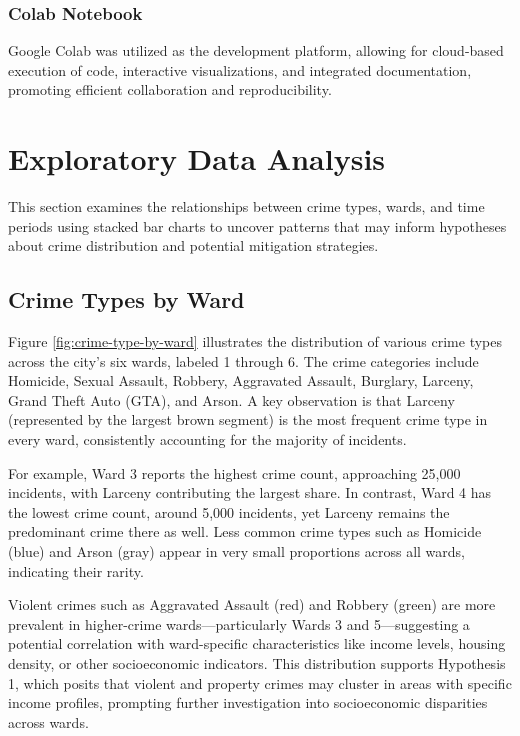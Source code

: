 \documentclass{report}
\begin{document}
	\subsection{Colab Notebook}
	Google Colab was utilized as the development platform, allowing for cloud-based execution of code, interactive visualizations, and integrated documentation, promoting efficient collaboration and reproducibility.
	
	\chapter{Exploratory Data Analysis}
	
	\par This section examines the relationships between crime types, wards, and time periods using stacked bar charts to uncover patterns that may inform hypotheses about crime distribution and potential mitigation strategies.
	
	\section{Crime Types by Ward}
	\par  Figure \ref{fig:crime-type-by-ward} illustrates the distribution of various crime types across the city’s six wards, labeled 1 through 6. The crime categories include Homicide, Sexual Assault, Robbery, Aggravated Assault, Burglary, Larceny, Grand Theft Auto (GTA), and Arson. A key observation is that Larceny (represented by the largest brown segment) is the most frequent crime type in every ward, consistently accounting for the majority of incidents.

For example, Ward 3 reports the highest crime count, approaching 25,000 incidents, with Larceny contributing the largest share. In contrast, Ward 4 has the lowest crime count, around 5,000 incidents, yet Larceny remains the predominant crime there as well. Less common crime types such as Homicide (blue) and Arson (gray) appear in very small proportions across all wards, indicating their rarity.

Violent crimes such as Aggravated Assault (red) and Robbery (green) are more prevalent in higher-crime wards—particularly Wards 3 and 5—suggesting a potential correlation with ward-specific characteristics like income levels, housing density, or other socioeconomic indicators. This distribution supports Hypothesis 1, which posits that violent and property crimes may cluster in areas with specific income profiles, prompting further investigation into socioeconomic disparities across wards.
	
\end{document}
